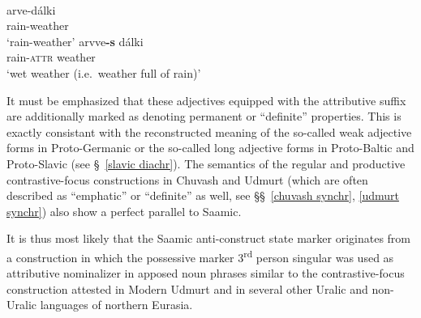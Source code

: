 {%
\begin{exe}
\ex
\begin{xlist}
\ex {}\\
\begin{xlist}
\ex
\gll	arve-dálki\\
	rain-weather\\
\glt	‘rain-weather’
\ex
\gll	arvve\textbf{-s} dálki\\
	rain-\textsc{attr} weather\\
\glt	‘wet weather (i.e.~weather full of rain)’
\end{xlist}
\end{xlist}
\end{exe}
It must be emphasized that these adjectives equipped with the attributive suffix are additionally marked as denoting permanent or “definite” properties. This is exactly consistant with the reconstructed meaning of the so-called weak adjective forms in Proto-Germanic or the so-called long adjective forms in Proto-Baltic and Proto-Slavic (see \S~\ref{slavic diachr}). The semantics of the regular and productive contrastive-focus constructions in Chuvash and Udmurt (which are often described as “emphatic” or “definite” as well, see \S\S~\ref{chuvash synchr}, \ref{udmurt synchr}) also show a perfect parallel to Saamic. 

It is thus most likely that the Saamic anti-construct state marker originates from a construction in which the possessive marker 3\textsuperscript{rd} person singular was used as attributive nominalizer in apposed noun phrases similar to the contrastive-focus construction attested in Modern Udmurt and in several other Uralic and non-Uralic languages of northern Eurasia.

}
